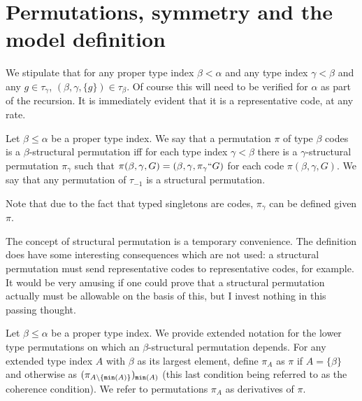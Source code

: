 \section{Permutations, symmetry and the model definition}

\begin{lemma}
\label {lem:singletons}

We stipulate that for any proper type index $\beta<\alpha$ and any type index $\gamma<\beta$ and any $g \in \tau_\gamma$, $(\beta,\gamma,\{g\})\in \tau_\beta$.  Of course this will need to be verified for $\alpha$ as part of the recursion.  It is immediately evident that it is a representative code, at any rate.

\end{lemma}

\begin{definition}
  \label {def:structural}

Let $\beta\leq \alpha$ be a proper type index.  We say that a permutation $\pi$ of type $\beta$ codes is a $\beta$-structural permutation iff for each type index $\gamma<\beta$ there is a $\gamma$-structural permutation $\pi_\gamma$ such that
$\pi(\beta,\gamma,G) = (\beta,\gamma,\pi_\gamma``G)$ for each code $\pi(\beta,\gamma,G)$.  We say that any permutation of $\tau_{-1}$ is a structural permutation.

Note that due to the fact that typed singletons are codes, $\pi_\gamma$ can be defined given $\pi$.

\end{definition}

The concept of structural permutation is a temporary convenience.  The definition does have some interesting consequences which are not used:  a structural permutation must send representative codes to representative codes, for example.  It would be very amusing if one could prove that a structural permutation actually must be allowable on the basis of this,  but I invest nothing in this passing thought.

\begin{definition}
\label {def:derivative}

Let $\beta\leq \alpha$ be a proper type index.  We provide extended notation for the lower type permutations on which an $\beta$-structural permutation depends.
For any extended type index $A$ with $\beta$ as its largest element, define $\pi_A$ as $\pi$ if $A = \{\beta\}$
and otherwise as $(\pi_{A \setminus \{{\tt min}(A)\}})_{{\tt min}(A)}$ (this last condition being referred to as the coherence condition).  We refer to permutations $\pi_A$ as derivatives of $\pi$.
\end{definition}

